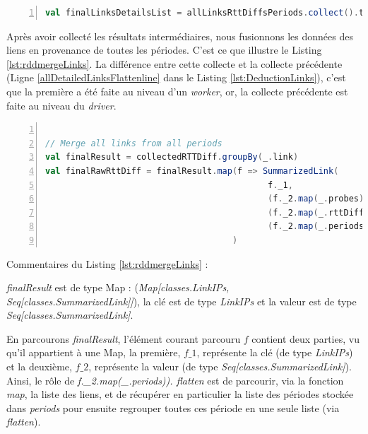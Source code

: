 \begin{lstlisting}[language=scala,firstnumber=1, caption={Collecte des résultats intermédiares },label={lst:rddcollecte}, basicstyle = \footnotesize,escapechar=|,numbers=left,
stepnumber=1]
val finalLinksDetailsList = allLinksRttDiffsPeriods.collect().toSeq.flatten
\end{lstlisting}

Après avoir collecté les résultats intermédiaires, nous fusionnons les données des liens en provenance de toutes les périodes. C'est ce que illustre le Listing \ref{lst:rddmergeLinks}. La différence entre cette collecte et la collecte précédente (Ligne \ref{allDetailedLinksFlattenline} dans le Listing \ref{lst:DeductionLinks}), c'est que la première a été faite au niveau d'un \textit{worker}, or, la collecte précédente est faite au niveau du \textit{driver}.

\begin{lstlisting}[language=scala,firstnumber=1, caption={Fusion des liens de toute la période de l'analyse},label={lst:rddmergeLinks}, basicstyle = \footnotesize,escapechar=|,numbers=left,
stepnumber=1]

// Merge all links from all periods
val finalResult = collectedRTTDiff.groupBy(_.link)
val finalRawRttDiff = finalResult.map(f => SummarizedLink(
                                            f._1, 
                                            (f._2.map(_.probes)).flatten, 
                                            (f._2.map(_.rttDiffs)).flatten, 
                                            (f._2.map(_.periods)).flatten)
                                     )
\end{lstlisting}

Commentaires  du Listing \ref{lst:rddmergeLinks} :

\noindent \textit{finalResult} est de type Map  : (\textit{Map[classes.LinkIPs, Seq[classes.SummarizedLink]]}), la clé est de type \textit{LinkIPs} et la valeur est de type
 \textit{Seq[classes.SummarizedLink]}.

\noindent En parcourons  \textit{finalResult}, l'élément courant parcouru $f$ contient deux parties, vu qu'il appartient à une Map, la première, $ f\_1 $, représente la clé (de type \textit{LinkIPs})  et la deuxième,  $ f\_2 $, représente la valeur (de type  \textit{Seq[classes.SummarizedLink]}).  Ainsi, le rôle de \textit{f.\_2.map(\_.periods)). flatten} est de parcourir, via la fonction \textit{map}, la liste des liens, et de récupérer en particulier la liste des périodes stockée dans \textit{periods} pour ensuite regrouper toutes ces période en une seule liste (via \textit{flatten}).


